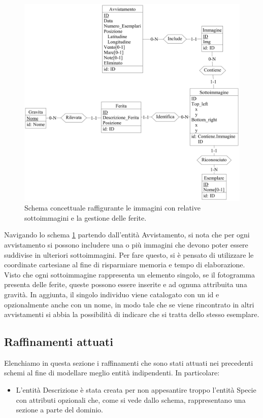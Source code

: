 \documentclass[a4paper,final,12pt]{report}
\begin{document}
\begin{figure}[hbtp]
\centering
\includegraphics[scale=0.10]{img_concettuale/avvistamento3.png}
\caption{Schema concettuale raffigurante le immagini con relative sottoimmagini e la gestione delle ferite.}
\label{figura:immsottoferite}
\end{figure}

Navigando lo schema \ref{figura:immsottoferite} partendo dall'entità Avvistamento, si nota che per ogni avvistamento si possono includere una o più immagini che  devono poter essere suddivise in ulteriori sottoimmagini. Per fare questo, si è pensato di utilizzare le coordinate cartesiane al fine di risparmiare memoria e tempo di elaborazione. Visto che ogni sottoimmagine rappresenta un elemento singolo, se il fotogramma presenta delle ferite, queste possono essere inserite e ad ognuna attribuita una gravità. In aggiunta, il singolo individuo viene catalogato con un id e opzionalmente anche con un nome, in modo tale che se viene rincontrato in altri avvistamenti si abbia la possibilità di indicare che si tratta dello stesso esemplare.

\subsection{Raffinamenti attuati}
Elenchiamo in questa sezione i raffinamenti che sono stati attuati nei precedenti schemi al fine di modellare meglio entità indipendenti. In particolare:
\begin{itemize}
\item L'entità Descrizione è stata creata per non appesantire troppo l'entità Specie con attributi opzionali che, come si vede dallo schema, rappresentano una sezione a parte del dominio. 
\end{itemize}
\end{document}
